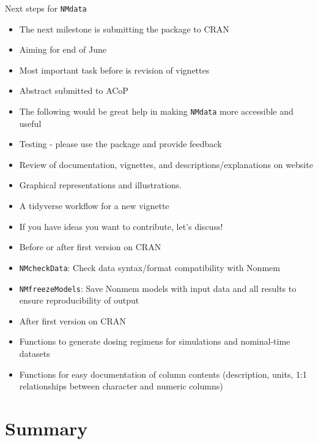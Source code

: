 \documentclass[
  8pt,
  ignorenonframetext,
  aspectratio=169]{beamer}
\begin{document}
\begin{frame}[fragile]{Next steps for \texttt{NMdata}}
\protect\hypertarget{next-steps-for-nmdata-1}{}
\begin{itemize}
\item
  The next milestone is submitting the package to CRAN
\item
  Aiming for end of June
\item
  Most important task before is revision of vignettes
\item
  Abstract submitted to ACoP
\item
  The following would be great help in making \texttt{NMdata} more
  accessible and useful
\item
  Testing - please use the package and provide feedback
\item
  Review of documentation, vignettes, and descriptions/explanations on
  website
\item
  Graphical representations and illustrations.
\item
  A tidyverse workflow for a new vignette
\item
  If you have ideas you want to contribute, let's discuss!
\item
  Before or after first version on CRAN
\item
  \texttt{NMcheckData}: Check data syntax/format compatibility with
  Nonmem
\item
  \texttt{NMfreezeModels}: Save Nonmem models with input data and all
  results to ensure reproducibility of output
\item
  After first version on CRAN
\item
  Functions to generate dosing regimens for simulations and nominal-time
  datasets
\item
  Functions for easy documentation of column contents (description,
  units, 1:1 relationships between character and numeric columns)
\end{itemize}
\end{frame}

\hypertarget{summary}{%
\section{Summary}\label{summary}}
\end{document}
